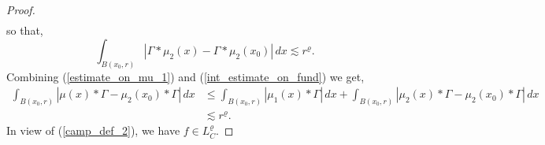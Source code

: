 \documentclass[12pt,a4paper,reqno]{amsart}
\newcommand{\cg}{\Gamma}
\numberwithin{equation}{section}
\theoremstyle{definition}
\begin{document}
\begin{proof}
\begin{align*}
\end{align*}
so that, \begin{equation}\label{int_estimate_on_fund}
 \int_{B(x_0,r)} | \cg \ast \mu_2(x) - \cg \ast \mu_2(x_0)|\,dx \lesssim r^{\varrho}.   
\end{equation}
Combining (\ref{estimate_on_mu_1}) and (\ref{int_estimate_on_fund}) we get, \begin{align*}
    \int_{B(x_0,r)} |  \mu(x) \ast \cg -  \mu_2(x_0) \ast \cg| \,dx &\leq \int_{B(x_0 , r)} | \mu_1(x) \ast \cg|\,dx + \int_{B(x_0 ,r)} |  \mu_2(x)\ast \cg -  \mu_2(x_0) \ast \cg|\,dx \\ &\lesssim r^{\varrho}.
\end{align*}
In view of (\ref{camp_def_2}), we have $f \in L_C^{\varrho}$.
\end{proof}
\end{document}
